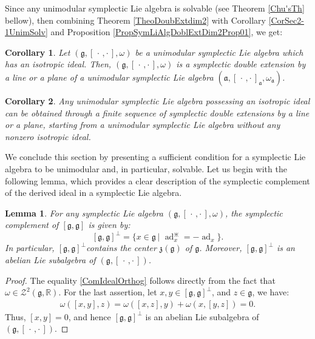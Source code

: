 \documentclass[final,1p,times,nopreprintline]{elsarticle}
\newtheorem{lemma}{Lemma}[section]
\newtheorem{corollary}{Corollary}[section]
\theoremstyle{definition}
\numberwithin{equation}{section}
\newcommand{\rel}{\mathbb{R}}
\newcommand{\w}{\omega}
\newcommand{\g}{\mathfrak{g}}
\newcommand{\ai}{\mathfrak{a}}
\newcommand{\ad}{\operatorname{ad}}
\numberwithin{equation}{section}
\newcommand{\aj}{\divideontimes}
\newcommand{\z}{\mathfrak{z}}
\newcommand{\cro}{[\,\cdot\,,\cdot\,]}
\begin{document}
Since any unimodular symplectic Lie algebra is solvable (see Theorem \ref{Chu'sTh} bellow), then combining Theorem \ref{TheoDoubExtdim2} with Corollary \ref{CorSec2-1UnimSolv} and Proposition \ref{PropSymLiAlgDoblExtDim2Prop01}, we get:

\begin{corollary}\label{TheoDoubExtdmi1dim2Unimodlr}
Let $(\g,\cro,\w)$ be a unimodular symplectic Lie algebra which has an isotropic ideal. Then, $(\g,\cro,\w)$ is a symplectic double extension by a line or a plane of a unimodular symplectic Lie algebra $(\ai,\cro_\ai,\w_\ai)$.
\end{corollary}

\begin{corollary}
Any unimodular symplectic Lie algebra possessing an isotropic ideal can be obtained through a finite sequence of symplectic double extensions by a line or a plane, starting from a unimodular symplectic Lie algebra without any nonzero isotropic ideal.
\end{corollary}


We conclude this section by presenting a sufficient condition for a symplectic Lie algebra to be unimodular and, in particular, solvable. Let us begin with the following lemma, which provides a clear description of the symplectic complement of the derived ideal in a symplectic Lie algebra.

\begin{lemma}\label{LemCentr}
	For any symplectic Lie algebra $(\g,[\,\cdot\,,\cdot\,],\w)$, the symplectic complement of $[\g,\g]$ is given by: 
	\begin{equation}\label{ComIdealOrthog}
		[\g,\g]^\perp=\Big\{x\in\g\,|\,\,\ad_x^\aj=-\ad_x\Big\}.
	\end{equation} 
	In particular, $[\g,\g]^\perp$contains the center $\z(\g)$ of $\g$. Moreover, $[\g,\g]^\perp$ is an abelian Lie subalgebra of $(\g,\cro)$.
\end{lemma}

\begin{proof}
	The equality \eqref{ComIdealOrthog} follows directly from the fact that $\w\in\mathcal{Z}^2(\g,\rel)$. For the last assertion, let $x,y\in[\g,\g]^\perp$, and $z\in\g$, we have:
	\begin{eqnarray*}
		\w([x,y],z)=\w([x,z],y)+\w(x,[y,z])=0.
	\end{eqnarray*}
	Thus, $[x,y]=0$, and hence $[\g,\g]^\perp$ is an abelian Lie subalgebra of $(\g,\cro)$.
\end{proof}
\end{document}
